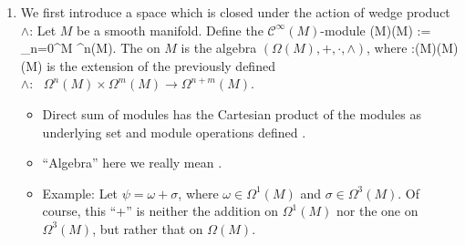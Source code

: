 \documentclass{article}
\newcommand{\cl}{:\text{ }}
\begin{document}
\begin{enumerate}
    
\item {} We first introduce a space which is closed under the action of  wedge product $\wedge$:
Let $M$ be a smooth manifold. Define the $\mathcal{C}^\infty(M)$-module
\bse
\Gr(M)\equiv\Omega(M) := \bigoplus_{n=0}^{\dim M} \Omega^n(M).
\ese
The  on $M$ is the algebra $(\Omega(M),+,\cdot,\wedge)$, where
\bse
\wedge\cl \Omega(M)\times\Omega(M)\to\Omega(M)
\ese
is the extension of the previously defined $\wedge\cl\Omega^n(M)\times\Omega^m(M)\to\Omega^{n+m}(M)$.


\begin{itemize}
    \item Direct sum of modules has the Cartesian product of the modules as underlying set and module operations defined .
    \item ``Algebra'' here we really mean .
    \item Example: Let $\psi=\omega+\sigma$, where $\omega\in\Omega^1(M)$ and $\sigma\in\Omega^3(M)$. Of course, this ``+'' is neither the addition on $\Omega^1(M)$ nor the one on $\Omega^3(M)$, but rather that on $\Omega(M)$.
\end{itemize}


\end{enumerate}
\end{document}
